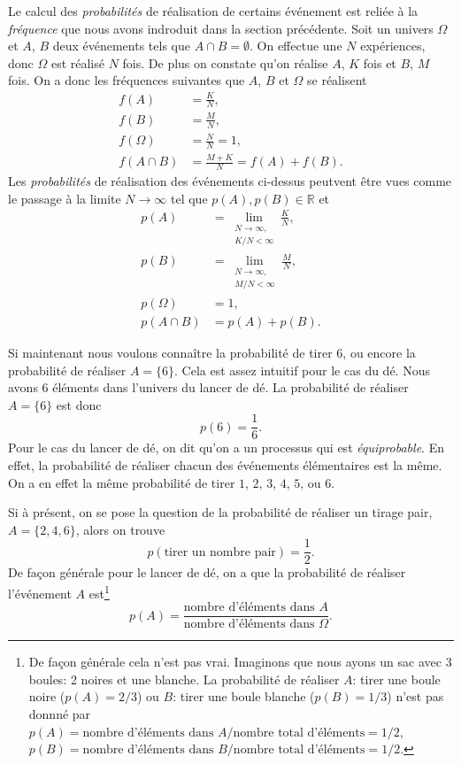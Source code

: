 \documentclass[a4paper,12pt]{book}
\newcommand{\real}{\mathbb{R}}
\begin{document}
Le calcul des \textit{probabilités} de réalisation de certains événement est reliée à la \textit{fréquence} 
que nous avons indroduit dans la section précédente. Soit un univers $\Omega$ et $A$, $B$ deux événements tels que $A\cap B=\emptyset$.
On effectue une $N$ expériences, donc $\Omega$ est réalisé $N$ fois. De plus on constate qu'on réalise $A$, $K$ fois et $B$, $M$ fois. 
On a donc les fréquences suivantes que $A$, $B$ et $\Omega$ se réalisent
\begin{align}
 f(A)&=\frac{K}{N},\\
 f(B)&=\frac{M}{N},\\
 f(\Omega)&=\frac{N}{N}=1,\\
 f(A\cap B)&=\frac{M+K}{N}=f(A)+f(B).
\end{align}
Les \textit{probabilités} de réalisation des événements ci-dessus peutvent être vues comme le passage à la limite
$N\rightarrow\infty$ tel que $p(A),p(B)\in\real$ et
\begin{align}
 p(A)&=\lim_{\substack{N\rightarrow\infty,\\ K/N<\infty}}\frac{K}{N},\\
 p(B)&=\lim_{\substack{N\rightarrow\infty,\\ M/N<\infty}}\frac{M}{N},\\
 p(\Omega)&=1,\\
 p(A\cap B)&=p(A)+p(B).
\end{align}

Si maintenant nous voulons connaître la probabilité de tirer $6$, ou encore la probabilité de réaliser $A=\{6\}$.  
Cela est assez intuitif pour le cas du dé. Nous avons $6$ éléments dans l'univers
du lancer de dé. La probabilité de réaliser $A=\{6\}$ est donc
\begin{equation}
 p(6)=\frac{1}{6}.
\end{equation}
Pour le cas du lancer de dé, on dit qu'on a un processus qui est \textit{équiprobable}. En effet,
la probabilité de réaliser chacun des événements élémentaires est la même. On a en effet la même probabilité de tirer 
$1$, $2$, $3$, $4$, $5$, ou $6$.

Si à présent, on se pose la question de la probabilité de réaliser un tirage pair, $A=\{2,4,6\}$, 
alors on trouve 
\begin{equation}
 p(\mbox{tirer un nombre pair})=\frac{1}{2}.
\end{equation}
De façon générale pour le lancer de dé, on a que la probabilité de réaliser l'événement $A$ est\footnote{De façon générale cela n'est pas vrai. Imaginons que nous
ayons un sac avec 3 boules: 2 noires et une blanche. La probabilité de réaliser $A$: tirer une boule noire ($p(A)=2/3$) ou $B$: tirer une boule blanche ($p(B)=1/3$) 
n'est pas donnné par $p(A)=\mbox{nombre d'éléments dans }A/\mbox{nombre total d'éléments}=1/2$, $p(B)=\mbox{nombre d'éléments dans }B/\mbox{nombre total d'éléments}=1/2$.}
\begin{equation}
p(A)=\frac{\mbox{nombre d'éléments dans }A}{\mbox{nombre d'éléments dans }\Omega}.
\end{equation}
\end{document}
